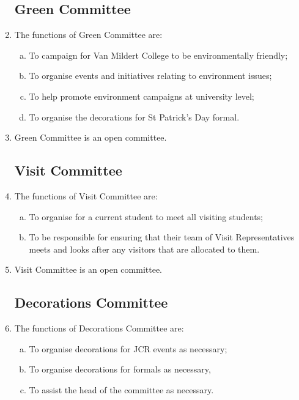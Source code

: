 \documentclass[12pt]{article}
\begin{document}
\begin{enumerate}
    \subsection{Green Committee}
    \item The functions of Green Committee are:
    \begin{enumerate}[(a)]
        \item To campaign for Van Mildert College to be environmentally friendly;
        \item To organise events and initiatives relating to environment issues;
        \item To help promote environment campaigns at university level;
        \item To organise the decorations for St Patrick’s Day formal.
    \end{enumerate}
    \item Green Committee is an open committee.
    \subsection{Visit Committee}
    \item The functions of Visit Committee are:
    \begin{enumerate}[(a)]
        \item To organise for a current student to meet all visiting students;
        \item To be responsible for ensuring that their team of Visit Representatives meets and looks after any visitors that are allocated to them.
    \end{enumerate}
    \item Visit Committee is an open committee.
    \subsection{Decorations Committee}
    \item The functions of Decorations Committee are:
    \begin{enumerate}[(a)]
        \item To organise decorations for JCR events as necessary;
        \item To organise decorations for formals as necessary,
        \item To assist the head of the committee as necessary.
    \end{enumerate}

\end{enumerate}
\end{document}
